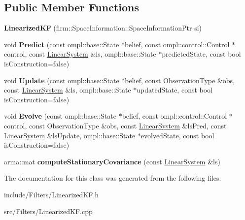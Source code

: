 \subsection*{\-Public \-Member \-Functions}
\begin{DoxyCompactItemize}
\item 
\hypertarget{class_linearized_k_f_af38864b2bbb3759c48011f152541ac93}{{\bfseries \-Linearized\-K\-F} (firm\-::\-Space\-Information\-::\-Space\-Information\-Ptr si)}\label{class_linearized_k_f_af38864b2bbb3759c48011f152541ac93}

\item 
\hypertarget{class_linearized_k_f_ac52dd09de6f36532f00427c3aba323c4}{void {\bfseries \-Predict} (const ompl\-::base\-::\-State $\ast$belief, const ompl\-::control\-::\-Control $\ast$control, const \hyperlink{class_linear_system}{\-Linear\-System} \&ls, ompl\-::base\-::\-State $\ast$predicted\-State, const bool is\-Construction=false)}\label{class_linearized_k_f_ac52dd09de6f36532f00427c3aba323c4}

\item 
\hypertarget{class_linearized_k_f_ab72b644fe84fc44263effe2e0fb3b8da}{void {\bfseries \-Update} (const ompl\-::base\-::\-State $\ast$belief, const \-Observation\-Type \&obs, const \hyperlink{class_linear_system}{\-Linear\-System} \&ls, ompl\-::base\-::\-State $\ast$updated\-State, const bool is\-Construction=false)}\label{class_linearized_k_f_ab72b644fe84fc44263effe2e0fb3b8da}

\item 
\hypertarget{class_linearized_k_f_a087bc963cbbd4b0291c9d628b627829d}{void {\bfseries \-Evolve} (const ompl\-::base\-::\-State $\ast$belief, const ompl\-::control\-::\-Control $\ast$control, const \-Observation\-Type \&obs, const \hyperlink{class_linear_system}{\-Linear\-System} \&ls\-Pred, const \hyperlink{class_linear_system}{\-Linear\-System} \&ls\-Update, ompl\-::base\-::\-State $\ast$evolved\-State, const bool is\-Construction=false)}\label{class_linearized_k_f_a087bc963cbbd4b0291c9d628b627829d}

\item 
\hypertarget{class_linearized_k_f_addb9369d36e6d9fcb49668f8ca19ad97}{arma\-::mat {\bfseries compute\-Stationary\-Covariance} (const \hyperlink{class_linear_system}{\-Linear\-System} \&ls)}\label{class_linearized_k_f_addb9369d36e6d9fcb49668f8ca19ad97}

\end{DoxyCompactItemize}


\-The documentation for this class was generated from the following files\-:\begin{DoxyCompactItemize}
\item 
include/\-Filters/\-Linearized\-K\-F.\-h\item 
src/\-Filters/\-Linearized\-K\-F.\-cpp\end{DoxyCompactItemize}
